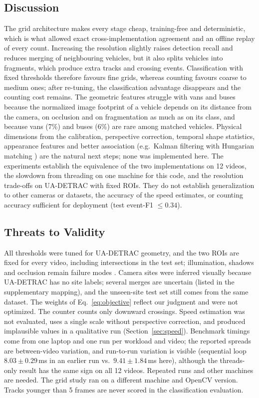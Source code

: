 \subsection{Discussion}
\label{sec:discussion}
The grid architecture makes every stage cheap, training-free and
deterministic, which is what allowed exact cross-implementation
agreement and an offline replay of every count. Increasing the resolution
slightly raises detection recall and reduces merging of neighbouring
vehicles, but it also splits vehicles into fragments, which produce extra
tracks and crossing events. Classification with fixed thresholds
therefore favours fine grids, whereas counting favours coarse to medium
ones; after re-tuning, the classification advantage disappears and the
counting cost remains. The geometric features struggle with vans and buses
because the normalized image footprint of a vehicle depends on its
distance from the camera, on occlusion and on fragmentation as much as on
its class, and because vans (7\%) and buses (6\%) are rare among matched
vehicles. Physical dimensions from the calibration, perspective
correction, temporal shape statistics, appearance features and better
association (e.g.\ Kalman filtering with Hungarian matching
\cite{bewley2016,wojke2017}) are the natural next steps; none was
implemented here. The experiments establish the equivalence of the two
implementations on 12 videos, the slowdown from threading on one machine
for this code, and the resolution trade-offs on UA-DETRAC with fixed
ROIs. They do not establish generalization to other cameras or datasets,
the accuracy of the speed estimates, or counting accuracy sufficient for
deployment (test event-F1 $\le0.34$).

\subsection{Threats to Validity}
\label{sec:threats}
All thresholds were tuned for UA-DETRAC geometry, and the two ROIs are
fixed for every video, including intersections in the test set;
illumination, shadows and occlusion remain failure modes
\cite{abbas2021,chen2020}. Camera sites were inferred visually because
UA-DETRAC has no site labels; several merges are uncertain (listed in the
supplementary mapping), and the unseen-site test set still comes from the
same dataset. The weights of Eq.~\eqref{eq:objective} reflect our
judgment and were not optimized. The counter counts only downward
crossings. Speed estimation was not evaluated, uses a single scale without
perspective correction, and produced implausible values in a qualitative
run (Section~\ref{sec:speed}). Benchmark timings come from one laptop and
one run per workload and video; the reported spreads are between-video
variation, and run-to-run variation is visible (sequential loop
$8.03\pm0.29$\,ms in an earlier run vs.\ $9.41\pm1.84$\,ms here), although
the threads-only result has the same sign on all 12 videos. Repeated runs
\cite{kalibera2013} and other machines are needed. The grid study ran on
a different machine and OpenCV version. Tracks younger than 5 frames are
never scored in the classification evaluation.

